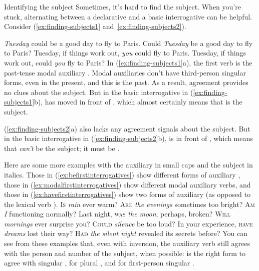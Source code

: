 \begin{tblsframed}{Identifying the subject}
\label{box:finding-subject}
\setlength{\parindent}{1.5em}
    \noindent Sometimes, it's hard to find the subject. When you're stuck, alternating between a declarative and a basic interrogative can be helpful. Consider (\ref{ex:finding-subjects1} and~\ref{ex:finding-subjects2}).

    \ea \label{ex:finding-subjects1}
    \ea \emph{Tuesday} could be a good day to fly to Paris.
        \ex Could \emph{Tuesday} be a good day to fly to Paris?
        \z
    \z
    \ea \label{ex:finding-subjects2}
        \ea Tuesday, if things work out, \emph{you} could fly to Paris.
        \ex Tuesday, if things work out, could \emph{you} fly to Paris?
        \z
    \z
    \indent In (\ref{ex:finding-subjects1}a), the first verb is the past-tense modal auxiliary . Modal auxiliaries don't have third-person singular forms, even in the present, and this is the past. As a result, agreement provides no clues about the subject. But in the basic interrogative in (\ref{ex:finding-subjects1}b),  has moved in front of , which almost certainly means that  is the subject.

    (\ref{ex:finding-subjects2}a) also lacks any agreement signals about the subject. But in the basic interrogative in (\ref{ex:finding-subjects2}b),  is in front of , which means that  \emph{can't} be the subject; it must be .

\end{tblsframed}

Here are some more examples with the auxiliary in small caps and the subject in italics. Those in (\ref{ex:befirstinterrogatives}) show different forms of auxiliary , those in (\ref{ex:modalfirstinterrogatives}) show different modal auxiliary verbs, and those in (\ref{ex:havefirstinterrogatives}) show two forms of auxiliary  (as opposed to the lexical verb ).
\ea \label{ex:befirstinterrogatives}
    \ea \textsc{Is} \emph{rain} ever warm?
        \ex \textsc{Are} \emph{the evenings} sometimes too bright?
        \ex \textsc{Am} \emph{I} functioning normally?
        \ex Last night, \textsc{was} \emph{the moon}, perhaps, broken?
    \z
\z
\ea \label{ex:modalfirstinterrogatives}
    \ea \textsc{Will} \emph{mornings} ever surprise you?
        \ex \textsc{Could} \emph{silence} be too loud?
    \z
\z
\ea\label{ex:havefirstinterrogatives}
    \ea In your experience, \textsc{have} \emph{dreams} lost their way?
    \ex \textsc{Had} \emph{the silent night} revealed its secrets before?
    \z
\z
You can see from these examples that, even with inversion, the auxiliary verb still agrees with the person and number of the subject, when possible:  is the right form to agree with singular ,  for plural , and  for first-person singular . 

